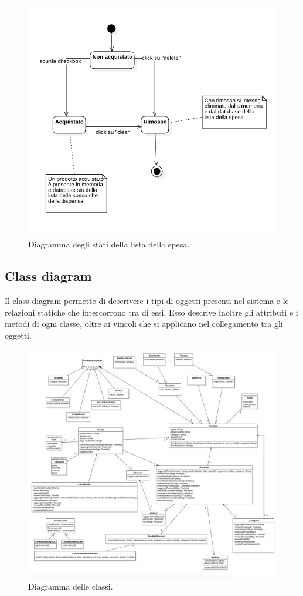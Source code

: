 \documentclass{article}
\begin{document}
\begin{figure}[H]
    \includegraphics[width=\linewidth]{images/state-shopping-list.png}
    \caption{Diagramma degli stati della lista della spesa.}
    \label{fig:stateshoplist}
\end{figure}

\subsection{Class diagram}

Il class diagram permette di descrivere i tipi di oggetti presenti nel sistema e le relazioni statiche che intercorrono tra di essi. Esso descrive inoltre gli attributi e i metodi di ogni classe, oltre ai vincoli che si applicano nel collegamento tra gli oggetti.

\begin{figure}[H]
    \includegraphics[width=\linewidth]{images/class.jpeg}
    \caption{Diagramma delle classi.}
    \label{fig:classdiagram}
\end{figure}
\end{document}
